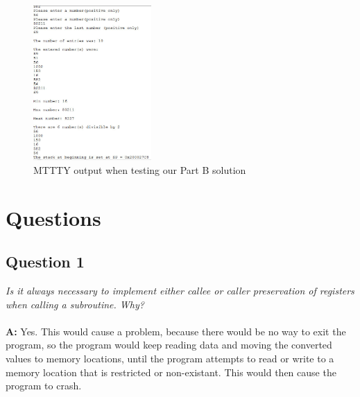 \documentclass[letterpaper]{article}
\begin{document}
      \begin{figure}[H]
        \centering
        \includegraphics[width=0.4\textwidth]{allparts.jpg}
        \caption{MTTTY output when testing our Part B solution}
      \end{figure}

\section{Questions}

    \subsection{Question 1}
      \textit{Is it always necessary to implement either callee or caller preservation of registers when calling a subroutine. Why?}
      \\ \\
      \noindent\textbf{A:}
      Yes. This would cause a problem, because there would be no way to exit the program,
      so the program would keep reading data and moving the converted values to
      memory locations, until the program attempts to read or write to a memory
      location that is restricted or non-existant. This would then cause the
      program to crash.
\end{document}
